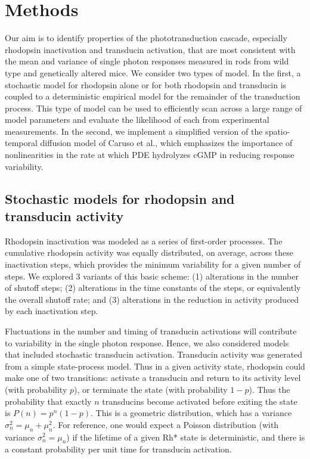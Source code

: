 \documentclass[12pt]{article}
\begin{document}

\section{Methods}

Our aim is to identify properties of the phototransduction cascade, especially rhodopsin inactivation and transducin activation, that are most consistent with the mean and variance of single photon responses measured in rods from wild type and genetically altered mice.    We consider two types of model.  In the first, a stochastic model for rhodopsin alone or for both rhodopsin and transducin is coupled to a deterministic empirical model for the remainder of the transduction process.  This type of model can be used to efficiently scan across a large range of model parameters and evaluate the likelihood of each from experimental measurements.  In the second, we implement a simplified version of the spatio-temporal diffusion model of Caruso et al., which emphasizes the importance of nonlinearities in the rate at which PDE hydrolyzes cGMP in reducing response variability.

\subsection{Stochastic models for rhodopsin and transducin activity}

Rhodopsin inactivation was modeled as a series of first-order processes.  The cumulative rhodopsin activity was equally distributed, on average, across these inactivation steps, which provides the minimum variability for a given number of steps.  We explored 3 variants of this basic scheme: (1) alterations in the number of shutoff steps; (2) alterations in the time constants of the steps, or equivalently the overall shutoff rate; and (3) alterations in the reduction in activity produced by each inactivation step.  

Fluctuations in the number and timing of transducin activations will contribute to variability in the single photon response.  Hence, we also considered models that included stochastic transducin activation.  Transducin activity was generated from a simple state-process model.  Thus in a given activity state, rhodopsin could make one of two transitions: activate a transducin and return to its activity level (with probability $p$), or terminate the state (with probability $1-p$).   Thus the probability that exactly $n$ transducins become activated before exiting the state is $P(n) = p^n (1-p)$.  This is a geometric distribution, which has a variance $\sigma_n^2 = \mu_n + \mu_n^2$.  For reference, one would expect a Poisson distribution (with variance $\sigma_n^2 = \mu_n$) if the lifetime of a given Rh* state is deterministic, and there is a constant probability per unit time for transducin activation.
\end{document}
